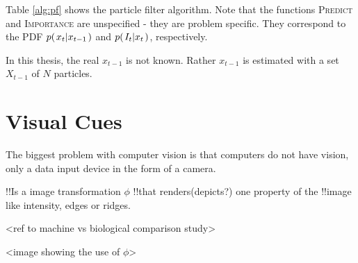 Table \ref{alg:pf} shows the particle filter algorithm. Note that the functions \textsc{Predict} and \textsc{Importance} are unspecified
- they are problem specific. They correspond to the PDF $p{(\left. x_t \middle\vert x_{t-1} \right.)}$ and $p{(\left. I_t \middle\vert x_t \right.)}$, respectively.


In this thesis, the real $x_{t-1}$ is not known. Rather $x_{t-1}$ is estimated with a set $X_{t-1}$ of $N$ particles.

\section{Visual Cues}

The biggest problem with computer vision is that computers do not have
vision, only a data input device in the form of a camera. 


!!Is a image transformation $\phi$ 
!!that renders(depicts?) one property of the
!!image like intensity, edges or ridges.

<ref to machine vs biological comparison study>


<image showing the use of $\phi$>



